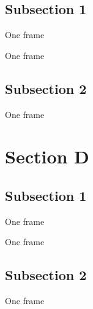 \documentclass[17pt,t,compress]{beamer}
\begin{document}
\subsection{Subsection 1}
\begin{frame}
One frame
\end{frame}

\begin{frame}
One frame
\end{frame}

\subsection{Subsection 2}
\begin{frame}
One frame
\end{frame}


\section{Section D}
\subsection{Subsection 1}
\begin{frame}
One frame
\end{frame}

\begin{frame}
One frame
\end{frame}

\subsection{Subsection 2}
\begin{frame}
One frame
\end{frame}
\end{document}
